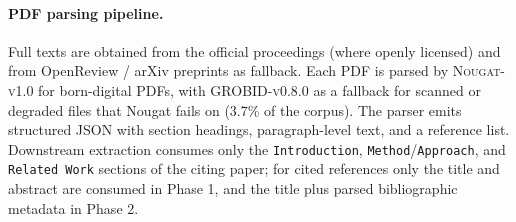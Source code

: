 \documentclass{opendatalab}
\begin{document}

\paragraph{PDF parsing pipeline.}
Full texts are obtained from the official proceedings (where openly licensed) and from OpenReview / arXiv
preprints as fallback. Each PDF is parsed by \textsc{Nougat-v1.0} for born-digital PDFs, with
\textsc{GROBID-v0.8.0} as a fallback for scanned or degraded files that Nougat fails on (3.7\% of the corpus). The
parser emits structured JSON with section headings, paragraph-level text, and a reference list. Downstream
extraction consumes only the \texttt{Introduction}, \texttt{Method}/\texttt{Approach}, and \texttt{Related Work}
sections of the citing paper; for cited references only the title and abstract are consumed in Phase 1, and the
title plus parsed bibliographic metadata in Phase 2.
\end{document}
